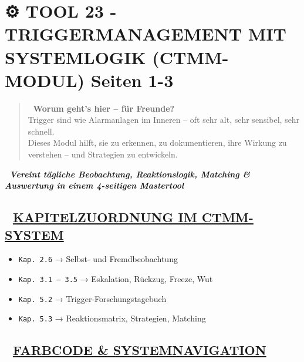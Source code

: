 %


\hypertarget{tool-23---triggermanagement-mit-systemlogik-ctmm-modul-seiten-1-3}{%
\section{\texorpdfstring{⚙️ \textbf{TOOL 23 - TRIGGERMANAGEMENT MIT SYSTEMLOGIK (CTMM-MODUL) Seiten 1-3}}{⚙️ TOOL 23 - TRIGGERMANAGEMENT MIT SYSTEMLOGIK (CTMM-MODUL) Seiten 1-3}}\label{tool-23---triggermanagement-mit-systemlogik-ctmm-modul-seiten-1-3}}

\begin{quote}
🧠 \textbf{Worum geht's hier -- für Freunde?}\\
Trigger sind wie Alarmanlagen im Inneren -- oft sehr alt, sehr sensibel, sehr schnell.\\
Dieses Modul hilft, sie zu erkennen, zu dokumentieren, ihre Wirkung zu verstehen -- und Strategien zu entwickeln.
\end{quote}

🧩 \emph{\textbf{Vereint tägliche Beobachtung, Reaktionslogik, Matching \& Auswertung in einem 4-seitigen Mastertool}}

\hypertarget{kapitelzuordnung-im-ctmm-system}{%
\subsection{\texorpdfstring{📘 \textbf{\ul{KAPITELZUORDNUNG IM CTMM-SYSTEM}}}{📘 KAPITELZUORDNUNG IM CTMM-SYSTEM}}\label{kapitelzuordnung-im-ctmm-system}}

\begin{itemize}
\tightlist
\item
  \texttt{Kap.\ }\texttt{2.6} → Selbst- und Fremdbeobachtung
\item
  \texttt{Kap.\ }\texttt{3.1\ –\ 3.5} → Eskalation, Rückzug, Freeze, Wut
\item
  \texttt{Kap.\ }\texttt{5.2} → Trigger-Forschungstagebuch
\item
  \texttt{Kap.\ }\texttt{5.3} → Reaktionsmatrix, Strategien, Matching
\end{itemize}

\hypertarget{farbcode-systemnavigation}{%
\subsection{\texorpdfstring{🎨 \textbf{\ul{FARBCODE \& SYSTEMNAVIGATION}}}{🎨 FARBCODE \& SYSTEMNAVIGATION}}\label{farbcode-systemnavigation}}

